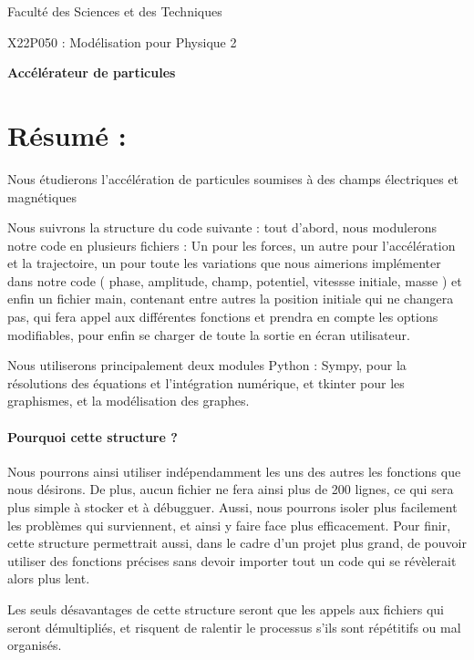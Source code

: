 \documentclass[a4paper,11pt]{article}			%
\begin{document}
\vspace*{-2cm}

\centerline{\LARGE Faculté des Sciences et des Techniques}
\vspace*{0.5cm}  
\centerline{\LARGE X22P050 : Modélisation pour Physique  2 }  
\vspace*{0.5cm}  

\centerline{\bf\Large Accélérateur de particules }
\vspace*{2cm}
\noindent

\section*{Résumé :}

Nous étudierons l’accélération de particules soumises à des champs électriques et magnétiques


Nous suivrons la structure du code suivante : tout d'abord, nous modulerons notre code en plusieurs fichiers :
Un pour les forces, un autre pour l'accélération et la trajectoire, un pour toute les variations que nous aimerions implémenter dans notre code ( phase, amplitude, champ, potentiel, vitessse initiale, masse ) et enfin un fichier main, contenant entre autres la position initiale qui ne changera pas, qui fera appel aux différentes fonctions et prendra en compte les options modifiables, pour enfin se charger de toute la sortie en écran utilisateur.

Nous utiliserons principalement deux modules Python : Sympy, pour la résolutions des équations et l'intégration numérique, et tkinter pour les graphismes, et la modélisation des graphes.
\paragraph{Pourquoi cette structure ?}
Nous pourrons ainsi utiliser indépendamment les uns des autres les fonctions que nous désirons. De plus, aucun fichier ne fera ainsi plus de 200 lignes, ce qui sera plus simple à stocker et à débugguer. Aussi, nous pourrons isoler plus facilement les problèmes qui surviennent, et ainsi y faire face plus efficacement. Pour finir, cette structure permettrait aussi, dans le cadre d'un projet plus grand, de pouvoir utiliser des fonctions précises sans devoir importer tout un code qui se révèlerait alors plus lent.

Les seuls désavantages de cette structure seront que les appels aux fichiers qui seront démultipliés, et risquent de ralentir le processus s'ils sont répétitifs ou mal organisés.
\end{document}
